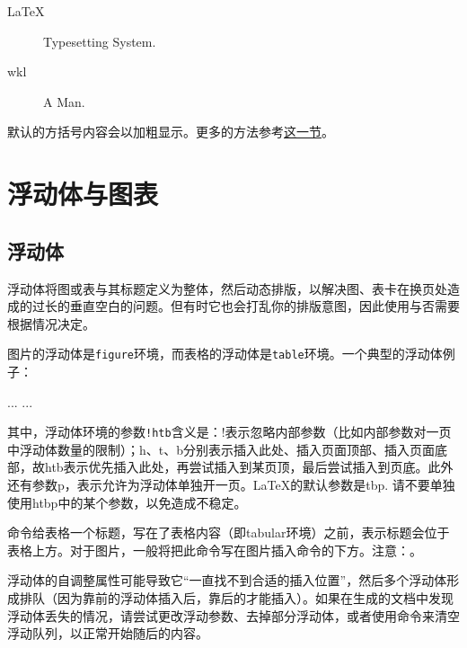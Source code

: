 {\begin{codeshow}
\begin{description}
  \item[LaTeX] Typesetting System.
  \item[wkl] A Man.
\end{description}
\end{codeshow}

默认的方括号内容会以加粗显示。更多的方法参考\hyperref[sec:list]{这一节}。

\section{浮动体与图表}
\label{sec:float}

\subsection{浮动体}
浮动体将图或表与其标题定义为整体，然后动态排版，以解决图、表卡在换页处造成的过长的垂直空白的问题。但有时它也会打乱你的排版意图，因此使用与否需要根据情况决定。

图片的浮动体是\texttt{figure}环境，而表格的浮动体是\texttt{table}环境。一个典型的浮动体例子：
\begin{latex}{}
\begin{table}[!htb]
  \begin{center}
    \caption{table-cap}
    \label{table-name}
    \begin{tabular}{...}
      ...
    \end{tabular}
  \end{center}
\end{table}
\end{latex}

其中，浮动体环境的参数\verb|!htb|含义是：!表示忽略内部参数（比如内部参数对一页中浮动体数量的限制）；h、t、b分别表示插入此处、插入页面顶部、插入页面底部，故htb表示优先插入此处，再尝试插入到某页顶，最后尝试插入到页底。此外还有参数p，表示允许为浮动体单独开一页。\LaTeX 的默认参数是tbp. 请不要单独使用htbp中的某个参数，以免造成不稳定。

\latexline{\\caption}命令给表格一个标题，写在了表格内容（即tabular环境）之前，表示标题会位于表格上方。对于图片，一般将把此命令写在图片插入命令的下方。注意：。\dpar

浮动体的自调整属性可能导致它“一直找不到合适的插入位置”，然后多个浮动体形成排队（因为靠前的浮动体插入后，靠后的才能插入）。如果在生成的文档中发现浮动体丢失的情况，请尝试更改浮动参数、去掉部分浮动体，或者使用\latexline{\\clearpage}命令来清空浮动队列，以正常开始随后的内容。

}
